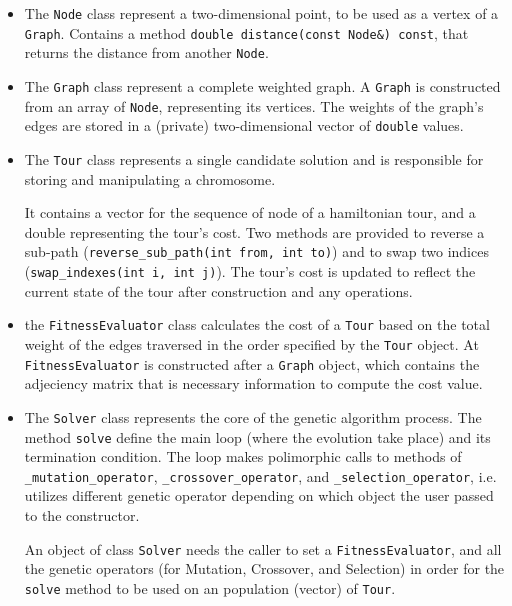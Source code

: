\documentclass[../main.tex]{subfiles}
\begin{document}
\begin{itemize}
\item The \texttt{Node} class represent a two-dimensional point, to be used as a vertex of a \texttt{Graph}. Contains a method \texttt{double distance(const Node\&) const}, that returns the distance from another \texttt{Node}.

\item The \texttt{Graph} class represent a complete weighted graph. A \texttt{Graph} is constructed from an array of \texttt{Node}, representing its vertices. The weights of the graph's edges are stored in a (private) two-dimensional vector of \texttt{double} values.

\item
The \texttt{Tour} class represents a single candidate solution and is responsible for storing and manipulating a chromosome. 

It contains a vector for the sequence of node of a hamiltonian tour, and a double representing the tour's cost. Two methods are provided to reverse a sub-path (\texttt{reverse\_sub\_path(int from, int to)}) and to swap two indices (\texttt{swap\_indexes(int i, int j)}). The tour's cost is updated to reflect the current state of the tour after construction and any operations.



\item the \texttt{FitnessEvaluator} class calculates the cost of a \texttt{Tour} based on the total weight of the edges traversed in the order specified by the \texttt{Tour} object. 
At \texttt{FitnessEvaluator} is constructed  after a \texttt{Graph} object, which contains the adjeciency matrix that is necessary information to compute the cost value.
    
\item 
The \texttt{Solver} class  represents the core of the genetic algorithm process. The method \texttt{solve} define the main loop (where the evolution take place) and its termination condition. The loop makes polimorphic calls to methods of \texttt{\_mutation\_operator}, \texttt{\_crossover\_operator}, and \texttt{\_selection\_operator}, i.e. utilizes different genetic operator depending on which object the user passed to the constructor.

An object of class \texttt{Solver} needs the caller to set a \texttt{FitnessEvaluator}, and all the genetic operators (for Mutation, Crossover, and Selection) in order for the \texttt{solve} method to be used on an population (vector) of \texttt{Tour}.

\end{itemize}
\end{document}

